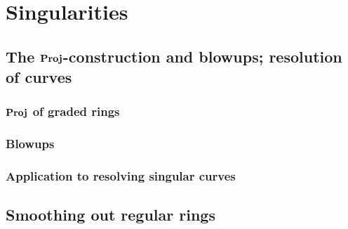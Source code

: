 \chapter{Singularities}
    \begin{abstract}
        
    \end{abstract}
    
    \minitoc
    
    \section{The \texorpdfstring{$\mathbf{Proj}$}{}-construction and blowups; resolution of curves}
        \subsection{\texorpdfstring{$\mathbf{Proj}$}{} of graded rings}
        
        \subsection{Blowups}
        
        \subsection{Application to resolving singular curves}
    
    \section{Smoothing out regular rings}
